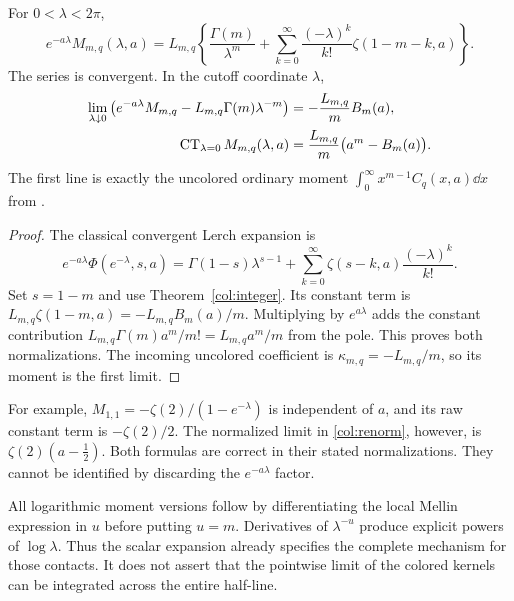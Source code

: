 \begin{theorem}\label{col:coalescence}
For $0<\lambda<2\pi$,
\begin{equation}\label{col:coalescence-formula}
 \boxed{\displaystyle
 e^{-a\lambda}M_{m,q}(\lambda,a)
 =L_{m,q}\left\{\frac{\Gamma(m)}{\lambda^m}
       +\sum_{k=0}^\infty
             \frac{(-\lambda)^k}{k!}\zeta(1-m-k,a)\right\}.}
\end{equation}
The series is convergent. In the cutoff coordinate $\lambda$,
\begin{align}
 \lim_{\lambda\downarrow0}
 \left(e^{-a\lambda}M_{m,q}
              -L_{m,q}\Gamma(m)\lambda^{-m}\right)
      &=-\frac{L_{m,q}}m B_m(a),\label{col:renorm}\\
 \operatorname{CT}_{\lambda=0}M_{m,q}(\lambda,a)
      &=\frac{L_{m,q}}m\bigl(a^m-B_m(a)\bigr).\label{col:raw-CT}
\end{align}
The first line is exactly the uncolored ordinary moment
$\int_0^\infty x^{m-1}C_q(x,a)\dd x$ from \cite{repobalanced}.
\end{theorem}

\begin{proof}
The classical convergent Lerch expansion \cite[25.14.3\_1]{dlmflerch}
is
\[
 e^{-a\lambda}\Phi(e^{-\lambda},s,a)
    =\Gamma(1-s)\lambda^{s-1}
       +\sum_{k=0}^\infty\zeta(s-k,a)\frac{(-\lambda)^k}{k!}.
\]
Set $s=1-m$ and use Theorem~\ref{col:integer}.
Its constant term is $L_{m,q}\zeta(1-m,a)
=-L_{m,q}B_m(a)/m$.
Multiplying by $e^{a\lambda}$ adds the constant contribution
$L_{m,q}\Gamma(m)a^m/m!=L_{m,q}a^m/m$ from the pole.
This proves both normalizations.
The incoming uncolored coefficient is
$\kappa_{m,q}=-L_{m,q}/m$, so its moment is the first limit.
\end{proof}

For example, $M_{1,1}=-\zeta(2)/(1-e^{-\lambda})$ is independent of
$a$, and its raw constant term is $-\zeta(2)/2$.
The normalized limit in \eqref{col:renorm}, however, is
$\zeta(2)(a-\tfrac12)$. Both formulas are correct in their stated
normalizations. They cannot be identified by discarding the
$e^{-a\lambda}$ factor.

All logarithmic moment versions follow by differentiating the local
Mellin expression in $u$ before putting $u=m$. Derivatives of
$\lambda^{-u}$ produce explicit powers of $\log\lambda$.
Thus the scalar expansion already specifies the complete mechanism
for those contacts. It does not assert that the pointwise limit of
the colored kernels can be integrated across the entire half-line.

